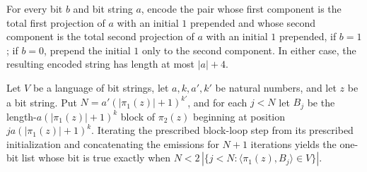 \begin{theorem}
\label{Complexity.length_majVote_le}
\leanok
{}
For every bit $b$ and bit string $a$, encode the pair whose first component is the total
first projection of $a$ with an initial $1$ prepended and whose second component is the
total second projection of $a$ with an initial $1$ prepended, if $b=1$; if $b=0$,
prepend the initial $1$ only to the second component. In either case, the resulting
encoded string has length at most $|a|+4$.
\end{theorem}

\begin{theorem}
\label{Complexity.majLoop_output}
\leanok
{}
Let $V$ be a language of bit strings, let $a,k,a',k'$ be natural numbers, and let $z$ be
a bit string. Put $N=a'(|\pi_1(z)|+1)^{k'}$, and for each $j<N$ let $B_j$ be the
length-$a(|\pi_1(z)|+1)^k$ block of $\pi_2(z)$ beginning at position $j
a(|\pi_1(z)|+1)^k$. Iterating the prescribed block-loop step from its prescribed
initialization and concatenating the emissions for $N+1$ iterations yields the one-bit
list whose bit is true exactly when $N<2\,|\{j<N: \langle\pi_1(z),B_j\rangle\in V\}|$.
\end{theorem}


